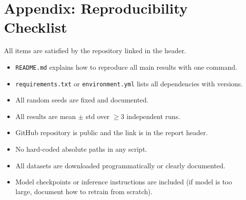 \documentclass[11pt, letterpaper]{article}
\begin{document}
\section{Appendix: Reproducibility Checklist}

All items are satisfied by the repository linked in the header.

\begin{itemize}[noitemsep]
  \item[$\boxtimes$] \texttt{README.md} explains how to reproduce all main results with one command.
  \item[$\boxtimes$] \texttt{requirements.txt} or \texttt{environment.yml} lists all dependencies with versions.
  \item[$\boxtimes$] All random seeds are fixed and documented.
  \item[$\boxtimes$] All results are mean $\pm$ std over $\geq$3 independent runs.
  \item[$\boxtimes$] GitHub repository is public and the link is in the report header.
  \item[$\boxtimes$] No hard-coded absolute paths in any script.
  \item[$\boxtimes$] All datasets are downloaded programmatically or clearly documented.
  \item[$\boxtimes$] Model checkpoints or inference instructions are included (if model is too large, document how to retrain from scratch).
\end{itemize}
\end{document}

